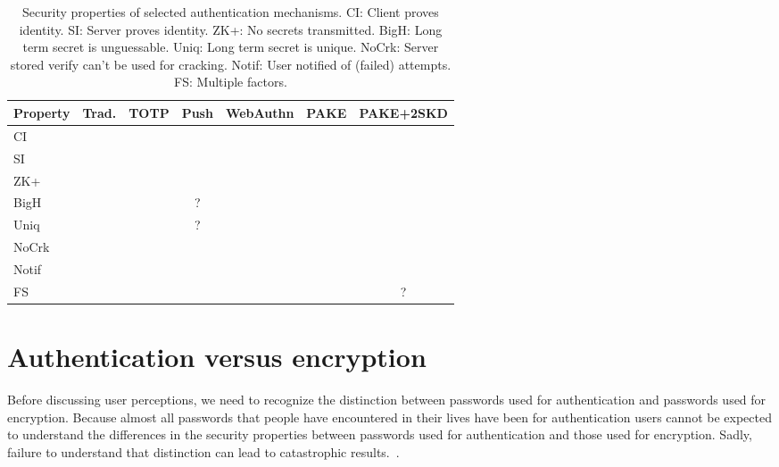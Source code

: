 \documentclass{soups}
\newcommand{\cmark}{\ding{51}}%
\newcommand{\xmark}{\ding{53}}%
\newcommand{\prop}[1]{\textsf{#1}}
\begin{document}
\begin{table}
  \begin{tabular}{lcccccc}
    \textbf{Property} & \textbf{Trad.}   & \textbf{TOTP}    & \textbf{Push}  & \textbf{WebAuthn}  & \textbf{PAKE}   & \textbf{PAKE+2SKD} \\
    \hline
    \prop{CI}       & \cmark  & \cmark  & \cmark  & \cmark & \cmark  & \cmark \\
    \prop{SI}       & \xmark  & \xmark  & \xmark  & \cmark & \cmark  & \cmark \\
    \prop{ZK+}      & \xmark  & \cmark  & \cmark  & \cmark & \cmark  & \cmark \\
    \prop{BigH}     & \xmark  & \cmark  & ?       & \cmark & \xmark  & \cmark \\
    \prop{Uniq}     & \xmark  & \cmark  & ?       & \cmark & \xmark  & \cmark \\
    \prop{NoCrk}    & \xmark  & \xmark  & \xmark  & \cmark & \xmark  & \cmark \\
    \prop{Notif}    & \xmark  & \xmark  & \cmark  & \xmark & \xmark  & \xmark \\
    \prop{FS}       & \xmark  & \cmark  & \cmark  & \cmark & \xmark  & ?
  \end{tabular}
  \caption[Security properties of selected authentication mechanisms]
      {Security properties of selected authentication mechanisms.
        \prop{CI}: Client proves identity.
        \prop{SI}: Server proves identity.
        \prop{ZK+}: No secrets transmitted.
        \prop{BigH}: Long term secret is unguessable.
        \prop{Uniq}: Long term secret is unique.
        \prop{NoCrk}: Server stored verify can't be used for cracking.
        \prop{Notif}: User notified of (failed) attempts.
        \prop{FS}: Multiple factors.}\label{tab:props}
\end{table}

\section{Authentication versus encryption}

Before discussing user perceptions, we need to recognize the distinction between passwords used for authentication and passwords used for encryption.
Because almost all passwords that people have encountered in their lives have been for authentication users cannot be expected to understand the differences in the security properties between passwords used for authentication and those used for encryption.
Sadly, failure to understand that distinction can lead to catastrophic results.~\autocite{Blaze2011:cablegate}.
\end{document}
